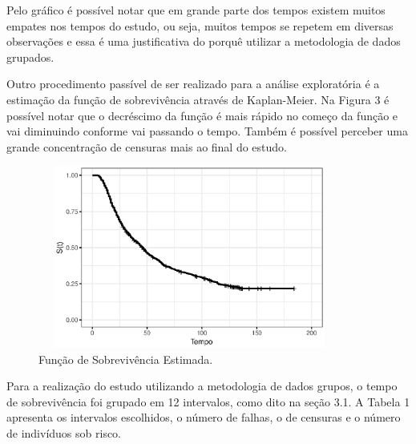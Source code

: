\documentclass[a4paper,12pt]{article}
\begin{document}
Pelo gráfico é possível notar que em grande parte dos tempos existem muitos empates nos tempos do estudo, ou seja, muitos tempos se repetem em diversas observações e essa é uma justificativa do porquê utilizar a metodologia de dados grupados.

Outro procedimento passível de ser realizado para a análise exploratória é a estimação da função de sobrevivência através de Kaplan-Meier. Na Figura 3 é possível notar que o decréscimo da função é mais rápido no começo da função e vai diminuindo conforme vai passando o tempo. Também é possível perceber uma grande concentração de censuras mais ao final do estudo. 

\begin{figure}[H] \label{fig:surv_vit}
  \begin{center}
    \includegraphics[width=10cm, height = 6cm]{surv_vit}
    \caption{Função de Sobrevivência Estimada.}
  \end{center}
\end{figure}

Para a realização do estudo utilizando a metodologia de dados grupos, o tempo de sobrevivência foi grupado em 12 intervalos, como dito na seção 3.1. A Tabela 1 apresenta os intervalos escolhidos, o número de falhas, o de censuras e o número de indivíduos sob risco.
\end{document}
